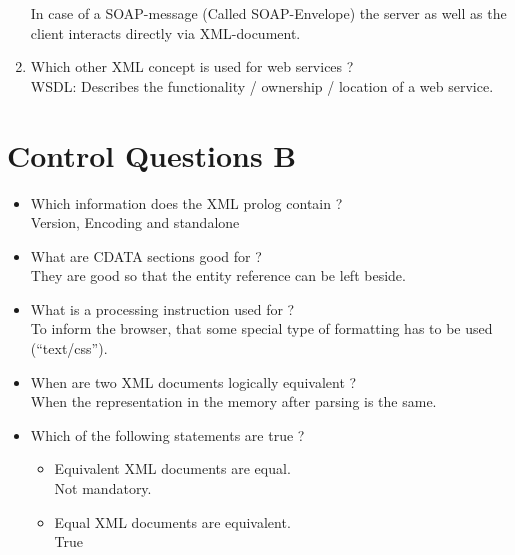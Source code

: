\begin{enumerate}
In case of a SOAP-message (Called SOAP-Envelope) the server as well as the client interacts directly via XML-document.
\item Which other XML concept is used for web services ?\\
WSDL: Describes the functionality / ownership / location of a web service.
\end{enumerate}

\section{Control Questions B}
\begin{itemize}
\item Which information does the XML prolog contain ?\\
Version, Encoding and standalone
\item What are CDATA sections good for ?\\
They are good so that the entity reference can be left beside.
\item What is a processing instruction used for ?\\
To inform the browser, that some special type of formatting has to be used ("`text/css"').
\item When are two XML documents logically equivalent ?\\
When the representation in the memory after parsing is the same.
\item Which of the following statements are true ?
\begin{itemize}
\item Equivalent XML documents are equal.\\
Not mandatory.
\item Equal XML documents are equivalent.\\
True
\end{itemize}
\end{itemize}